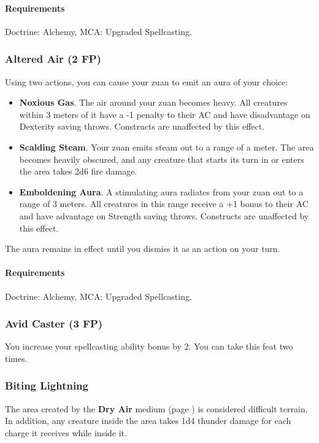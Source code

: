     \paragraph{Requirements} Doctrine: Alchemy, MCA: Upgraded Spellcasting.
\subsubsection{Altered Air (2 FP)} \label{feat::alteredair}
    Using two actions, you can cause your zuan to emit an aura of your choice:
    \begin{itemize}
        \item \textbf{Noxious Gas}.
        The air around your zuan becomes heavy.
        All creatures within 3 meters of it have a -1 penalty to their AC and have disadvantage on Dexterity saving throws.
        Constructs are unaffected by this effect.
        \item \textbf{Scalding Steam}.
        Your zuan emits steam out to a range of a meter.
        The area becomes heavily obscured, and any creature that starts its turn in or enters the area takes 2d6 fire damage.
        \item \textbf{Emboldening Aura}.
        A stimulating aura radiates from your zuan out to a range of 3 meters.
        All creatures in this range receive a +1 bonus to their AC and have advantage on Strength saving throws.
        Constructs are unaffected by this effect.
    \end{itemize}

    The aura remains in effect until you dismiss it as an action on your turn.
    \paragraph{Requirements} Doctrine: Alchemy, MCA: Upgraded Spellcasting.
\subsubsection{Avid Caster (3 FP)} \label{feat::avidcaster}
    You increase your spellcasting ability bonus by 2.
    You can take this feat two times.
\subsubsection{Biting Lightning} \label{feat::bitinglightning}
    The area created by the \textbf{Dry Air} medium (page \pageref{medium::dryair}) is considered difficult terrain.
    In addition, any creature inside the area takes 1d4 thunder damage for each charge it receives while inside it.
